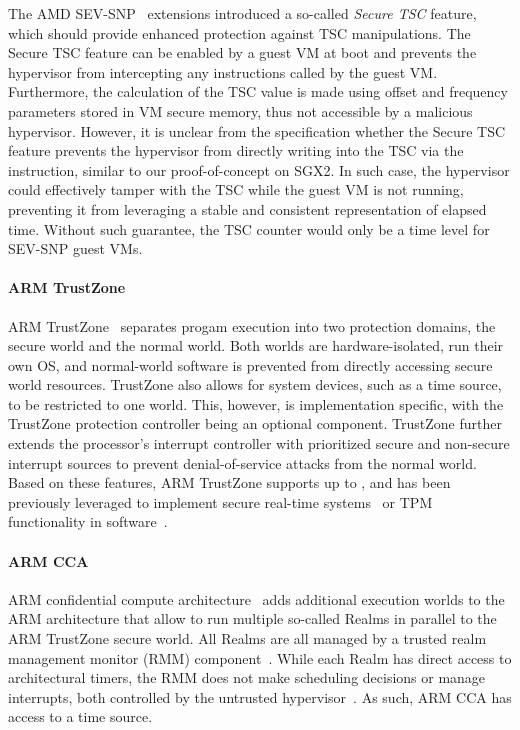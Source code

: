 The AMD SEV-SNP~\cite{AmdSevSnp} extensions introduced a so-called \emph{Secure
\ac{TSC}} feature, which should provide enhanced protection against \ac{TSC}
manipulations. The Secure \ac{TSC} feature can be enabled by a guest VM at boot
and prevents the hypervisor from intercepting any  instructions
called by the guest VM. Furthermore, the calculation of the \ac{TSC} value is
made using offset and frequency parameters stored in VM secure memory, thus not
accessible by a malicious hypervisor. However, it is unclear from the
specification whether the Secure \ac{TSC} feature prevents the hypervisor from
directly writing into the \ac{TSC} via the  instruction, similar to
our proof-of-concept on SGX2. In such case, the hypervisor could effectively
tamper with the \ac{TSC} while the guest VM is not running, preventing it from
leveraging a stable and consistent representation of elapsed time. Without such
guarantee, the \ac{TSC} counter would only be a \Tzero time level for SEV-SNP
guest VMs.

\paragraph{ARM TrustZone}

ARM TrustZone~\cite{Pinto2019DemystifyingAT} separates progam execution into two
protection domains, the secure world and the normal world. Both worlds are
hardware-isolated, run their own OS, and normal-world software is prevented from
directly accessing secure world resources. TrustZone also allows for system
devices, such as a time source, to be restricted to one world. This, however, is
implementation specific, with the TrustZone protection controller being
an optional component. TrustZone further extends the processor's interrupt
controller with prioritized secure and non-secure interrupt sources to prevent
denial-of-service attacks from the normal world. Based on these features, ARM
TrustZone supports up to \Tfour{}, and has been previously leveraged to
implement secure real-time systems~\cite{wang2022rttee} or TPM functionality in
software~\cite{raj2016ftpm}.

\paragraph{ARM CCA}
ARM confidential compute architecture~\cite{arm-cca} adds additional execution
worlds to the ARM architecture that allow to run multiple so-called Realms in
parallel to the ARM TrustZone secure world. All Realms are all managed by a
trusted realm management monitor (RMM) component~\cite{arm-rmm}. While each
Realm has direct access to architectural timers, the RMM does not make
scheduling decisions or manage interrupts, both controlled by the untrusted
hypervisor~\cite{arm-cca}. As such, ARM CCA has access to a \Tthree{} time
source.

